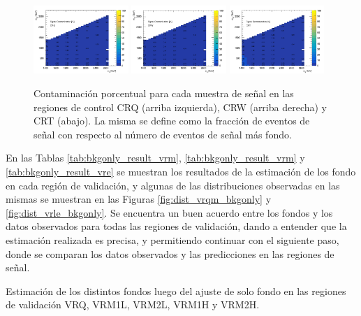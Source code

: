 \begin{figure}[!ht]

  \centering
  \includegraphics[width=0.32\textwidth]{images/results/signal_contamination_bb_CRQ_139ifb_2.pdf}
  \includegraphics[width=0.32\textwidth]{images/results/signal_contamination_bb_CRW_139ifb_2.pdf}
  \includegraphics[width=0.32\textwidth]{images/results/signal_contamination_bb_CRT_139ifb_2.pdf}
  \caption{Contaminación porcentual para cada muestra de señal en las regiones de control CRQ (arriba izquierda), CRW (arriba derecha) y CRT (abajo). La misma se define como la fracción de eventos de señal con respecto al número de eventos de señal más fondo.}
  \label{fig:signal_contamination_CR_bb}

\end{figure}


En las Tablas \ref{tab:bkgonly_result_vrm}, \ref{tab:bkgonly_result_vrm} y \ref{tab:bkgonly_result_vre} se muestran los resultados de la estimación de los fondo en cada región de validación, y algunas de las distribuciones observadas en las mismas se muestran en las Figuras \ref{fig:dist_vrqm_bkgonly} y \ref{fig:dist_vrle_bkgonly}. Se encuentra un buen acuerdo entre los fondos y los datos observados para todas las regiones de validación, dando a entender que la estimación realizada es precisa, y permitiendo continuar con el siguiente paso, donde se comparan los datos observados y las predicciones en las regiones de señal. 


\begin{table}[!ht]
  \centering
  \caption{Estimación de los distintos fondos luego del ajuste de solo fondo en las regiones de validación VRQ, VRM1L, VRM2L, VRM1H y VRM2H.}
  \resizebox{\textwidth}{!}{}
  \label{tab:bkgonly_result_vrm}
\end{table}


